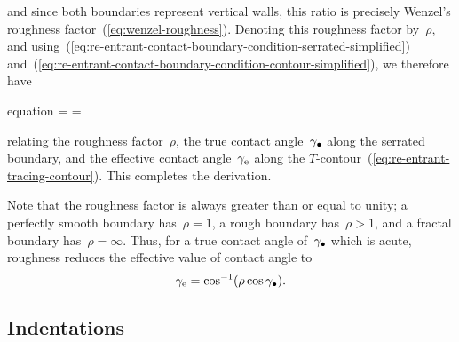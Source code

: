 and since both boundaries represent vertical walls,
this ratio is precisely Wenzel's roughness factor~(\ref{eq:wenzel-roughness}).
Denoting this roughness factor by~$\rho$,
and using~(\ref{eq:re-entrant-contact-boundary-condition-serrated-simplified})
and~(\ref{eq:re-entrant-contact-boundary-condition-contour-simplified}),
we therefore have
\begin{important}{equation}
  \rho =  = \frac{\cos\gamma_\eff}{\cos\gamma_\tr}
  \label{eq:roughness-cosine-ratio}
\end{important}
relating the roughness factor~$\rho$,
the true contact angle~$\gamma_\bullet$ along the serrated boundary,
and the effective contact angle~$\gamma_{\mathrm{e}}$
along the $T$-contour~(\ref{eq:re-entrant-tracing-contour}).
This completes the derivation.

\begin{figure}
\end{figure}

Note that the roughness factor is always greater than or equal to unity;
a perfectly smooth boundary has~$\rho = 1$,
a rough boundary has~$\rho > 1$,
and a fractal boundary has~$\rho = \infty$.
Thus, for a true contact angle of~$\gamma_\bullet$ which is acute,
roughness reduces the effective value of contact angle to
\begin{equation}
  \gamma_\eff = \cos^{-1} \roundbr*{\rho \cos\gamma_\tr}.
  \label{eq:effective-contact-angle}
\end{equation}

\subsection{Indentations}
\label{sec:re-entrant.dip-coating.indentations}

\begin{figure}
\end{figure}

